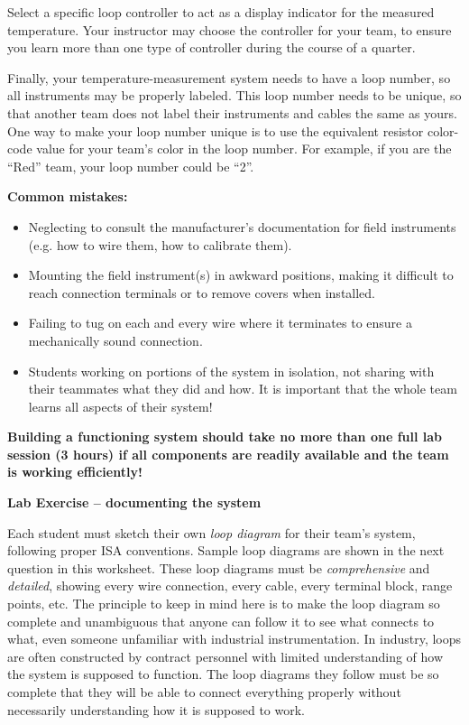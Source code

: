 Select a specific loop controller to act as a display indicator for the measured temperature.  Your instructor may choose the controller for your team, to ensure you learn more than one type of controller during the course of a quarter.

Finally, your temperature-measurement system needs to have a loop number, so all instruments may be properly labeled.  This loop number needs to be unique, so that another team does not label their instruments and cables the same as yours.  One way to make your loop number unique is to use the equivalent resistor color-code value for your team's color in the loop number.  For example, if you are the ``Red'' team, your loop number could be ``2''. 

\vskip 10pt

{\bf Common mistakes:}

\begin{itemize}
\item{} Neglecting to consult the manufacturer's documentation for field instruments (e.g. how to wire them, how to calibrate them).
\item{} Mounting the field instrument(s) in awkward positions, making it difficult to reach connection terminals or to remove covers when installed.
\item{} Failing to tug on each and every wire where it terminates to ensure a mechanically sound connection.
\item{} Students working on portions of the system in isolation, not sharing with their teammates what they did and how.  It is important that the whole team learns all aspects of their system!
\end{itemize}

\vskip 10pt

{\bf Building a functioning system should take no more than one full lab session (3 hours) if all components are readily available and the team is working efficiently!}




\vfil \eject

\noindent
{\bf Lab Exercise -- documenting the system}

\vskip 5pt

Each student must sketch their own {\it loop diagram} for their team's system, following proper ISA conventions.  Sample loop diagrams are shown in the next question in this worksheet.  These loop diagrams must be {\it comprehensive} and {\it detailed}, showing every wire connection, every cable, every terminal block, range points, etc.  The principle to keep in mind here is to make the loop diagram so complete and unambiguous that anyone can follow it to see what connects to what, even someone unfamiliar with industrial instrumentation.  In industry, loops are often constructed by contract personnel with limited understanding of how the system is supposed to function.  The loop diagrams they follow must be so complete that they will be able to connect everything properly without necessarily understanding how it is supposed to work.


